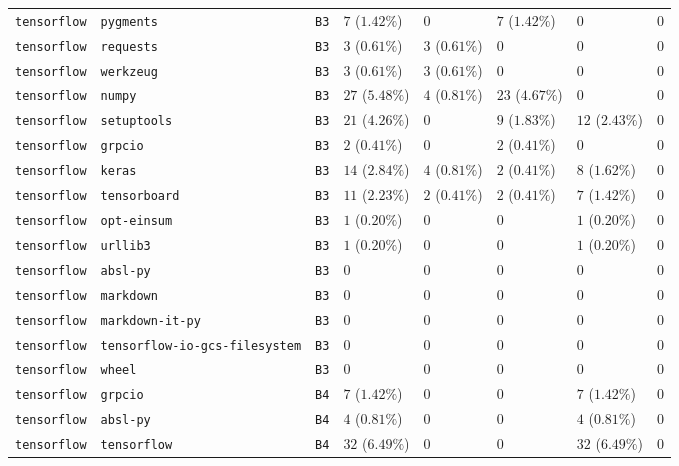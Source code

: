 \begin{table}
\begin{tabular}{llllllll}
\texttt{tensorflow} & \texttt{pygments} & \texttt{B3} & $7$ ($1.42\%$) & $0$ & $7$ ($1.42\%$) & $0$ & $0$ \\
\texttt{tensorflow} & \texttt{requests} & \texttt{B3} & $3$ ($0.61\%$) & $3$ ($0.61\%$) & $0$ & $0$ & $0$ \\
\texttt{tensorflow} & \texttt{werkzeug} & \texttt{B3} & $3$ ($0.61\%$) & $3$ ($0.61\%$) & $0$ & $0$ & $0$ \\
\texttt{tensorflow} & \texttt{numpy} & \texttt{B3} & $27$ ($5.48\%$) & $4$ ($0.81\%$) & $23$ ($4.67\%$) & $0$ & $0$ \\
\texttt{tensorflow} & \texttt{setuptools} & \texttt{B3} & $21$ ($4.26\%$) & $0$ & $9$ ($1.83\%$) & $12$ ($2.43\%$) & $0$ \\
\texttt{tensorflow} & \texttt{grpcio} & \texttt{B3} & $2$ ($0.41\%$) & $0$ & $2$ ($0.41\%$) & $0$ & $0$ \\
\texttt{tensorflow} & \texttt{keras} & \texttt{B3} & $14$ ($2.84\%$) & $4$ ($0.81\%$) & $2$ ($0.41\%$) & $8$ ($1.62\%$) & $0$ \\
\texttt{tensorflow} & \texttt{tensorboard} & \texttt{B3} & $11$ ($2.23\%$) & $2$ ($0.41\%$) & $2$ ($0.41\%$) & $7$ ($1.42\%$) & $0$ \\
\texttt{tensorflow} & \texttt{opt-einsum} & \texttt{B3} & $1$ ($0.20\%$) & $0$ & $0$ & $1$ ($0.20\%$) & $0$ \\
\texttt{tensorflow} & \texttt{urllib3} & \texttt{B3} & $1$ ($0.20\%$) & $0$ & $0$ & $1$ ($0.20\%$) & $0$ \\
\texttt{tensorflow} & \texttt{absl-py} & \texttt{B3} & $0$ & $0$ & $0$ & $0$ & $0$ \\
\texttt{tensorflow} & \texttt{markdown} & \texttt{B3} & $0$ & $0$ & $0$ & $0$ & $0$ \\
\texttt{tensorflow} & \texttt{markdown-it-py} & \texttt{B3} & $0$ & $0$ & $0$ & $0$ & $0$ \\
\texttt{tensorflow} & \texttt{tensorflow-io-gcs-filesystem} & \texttt{B3} & $0$ & $0$ & $0$ & $0$ & $0$ \\
\texttt{tensorflow} & \texttt{wheel} & \texttt{B3} & $0$ & $0$ & $0$ & $0$ & $0$ \\
\texttt{tensorflow} & \texttt{grpcio} & \texttt{B4} & $7$ ($1.42\%$) & $0$ & $0$ & $7$ ($1.42\%$) & $0$ \\
\texttt{tensorflow} & \texttt{absl-py} & \texttt{B4} & $4$ ($0.81\%$) & $0$ & $0$ & $4$ ($0.81\%$) & $0$ \\
\texttt{tensorflow} & \texttt{tensorflow} & \texttt{B4} & $32$ ($6.49\%$) & $0$ & $0$ & $32$ ($6.49\%$) & $0$ \\

\end{tabular}
\end{table}

